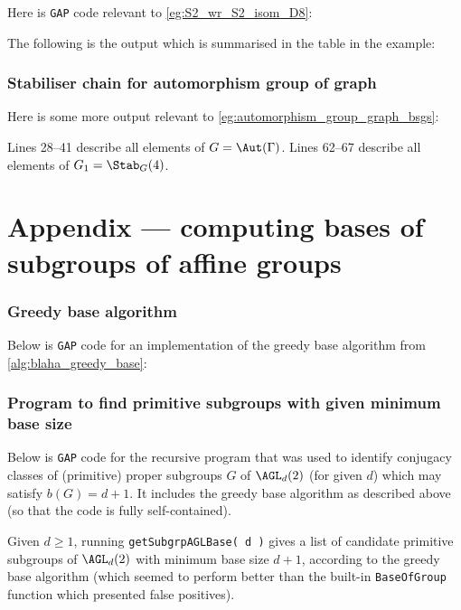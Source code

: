 Here is \texttt{GAP} code relevant to \autoref{eg:S2_wr_S2_isom_D8}:



The following is the output which is summarised in the table in the example:



\subsection{Stabiliser chain for automorphism group of graph}

Here is some more output relevant to \autoref{eg:automorphism_group_graph_bsgs}:\label{app:automorphism_group_graph_bsgs}



Lines 28--41 describe all elements of $G = \Aut(\Gamma)$. Lines 62--67 describe all elements of $G_1 = \Stab_G(4)$.

\chapter{Appendix --- computing bases of subgroups of affine groups}%

\subsection{Greedy base algorithm}

Below is \texttt{GAP} code for an implementation of the greedy base algorithm from \autoref{alg:blaha_greedy_base}:



\subsection{Program to find primitive subgroups with given minimum base size}

Below is \texttt{GAP} code for the recursive program that was used to identify conjugacy classes of (primitive) proper subgroups $G$ of $\AGL_d(2)$ (for given $d$) which may satisfy $b(G) = d + 1$. It includes the greedy base algorithm as described above (so that the code is fully self-contained).

Given $d \geq 1$, running \texttt{getSubgrpAGLBase( d )} gives a list of candidate primitive subgroups of $\AGL_d(2)$ with minimum base size $d + 1$, according to the greedy base algorithm (which seemed to perform better than the built-in \texttt{BaseOfGroup} function which presented false positives).

